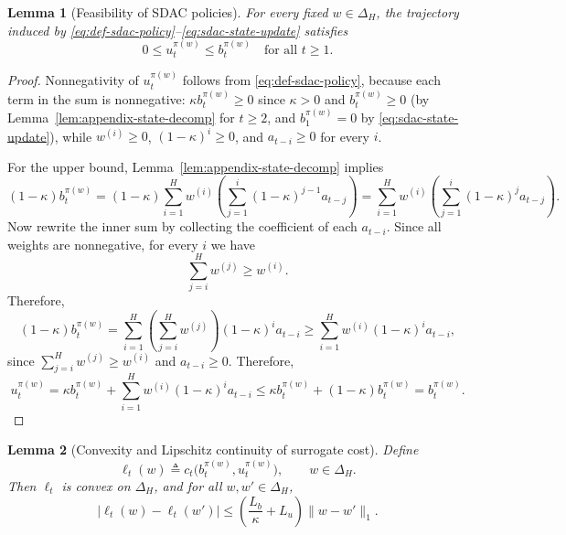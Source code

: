\documentclass[11pt]{article}
\newtheorem{lemma}{Lemma}
\begin{document}
\begin{lemma}[Feasibility of SDAC policies]
\label{lem:appendix-feasibility}
For every fixed $w\in\Delta_H$, the trajectory induced by \eqref{eq:def-sdac-policy}--\eqref{eq:sdac-state-update} satisfies
\[
0\le u_t^{\pi(w)}\le b_t^{\pi(w)} \quad \text{for all } t\ge 1.
\]
\end{lemma}

\begin{proof}
Nonnegativity of $u_t^{\pi(w)}$ follows from \eqref{eq:def-sdac-policy}, because each term in the sum is nonnegative: $\kappa b_t^{\pi(w)}\ge 0$ since $\kappa>0$ and $b_t^{\pi(w)}\ge 0$ (by Lemma~\ref{lem:appendix-state-decomp} for $t\ge 2$, and $b_1^{\pi(w)}=0$ by \eqref{eq:sdac-state-update}), while $w^{(i)}\ge 0$, $(1-\kappa)^i\ge 0$, and $a_{t-i}\ge 0$ for every $i$.

For the upper bound, Lemma~\ref{lem:appendix-state-decomp} implies
\[
(1-\kappa)b_t^{\pi(w)}
=
(1-\kappa)\sum_{i=1}^H w^{(i)}\!\left(\sum_{j=1}^{i}(1-\kappa)^{j-1}a_{t-j}\right)
=
\sum_{i=1}^H w^{(i)}\!\left(\sum_{j=1}^{i}(1-\kappa)^j a_{t-j}\right).
\]
Now rewrite the inner sum by collecting the coefficient of each $a_{t-i}$. Since all weights are nonnegative, for every $i$ we have
\[
\sum_{j=i}^{H} w^{(j)} \ge w^{(i)}.
\]
Therefore,
\[
(1-\kappa)b_t^{\pi(w)}
=
\sum_{i=1}^{H}\left(\sum_{j=i}^{H}w^{(j)}\right)(1-\kappa)^i a_{t-i}
\ge
\sum_{i=1}^{H}w^{(i)}(1-\kappa)^i a_{t-i},
\]
since $\sum_{j=i}^{H}w^{(j)}\ge w^{(i)}$ and $a_{t-i}\ge 0$. Therefore,
\[
u_t^{\pi(w)}
=
\kappa b_t^{\pi(w)} + \sum_{i=1}^{H}w^{(i)}(1-\kappa)^i a_{t-i}
\le
\kappa b_t^{\pi(w)} + (1-\kappa)b_t^{\pi(w)}
=
b_t^{\pi(w)}.
\]
\end{proof}

\begin{lemma}[Convexity and Lipschitz continuity of surrogate cost]
\label{lem:appendix-surrogate}
Define
\[
\ell_t(w) \triangleq c_t\bigl(b_t^{\pi(w)},u_t^{\pi(w)}\bigr), \qquad w\in\Delta_H.
\]
Then $\ell_t$ is convex on $\Delta_H$, and for all $w,w'\in\Delta_H$,
\[
|\ell_t(w)-\ell_t(w')|
\le
\left(\frac{L_b}{\kappa}+L_u\right)\|w-w'\|_1.
\]
\end{lemma}
\end{document}
